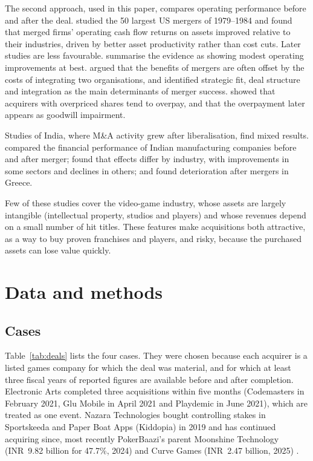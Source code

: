\documentclass[sn-basic]{sn-jnl}
\newcommand{\INR}{INR~}
\begin{document}
The second approach, used in this paper, compares operating performance before and after the deal. \citet{healy1992} studied the 50 largest US mergers of 1979--1984 and found that merged firms' operating cash flow returns on assets improved relative to their industries, driven by better asset productivity rather than cost cuts. Later studies are less favourable. \citet{andrade2001} summarise the evidence as showing modest operating improvements at best. \citet{lubatkin1983} argued that the benefits of mergers are often offset by the costs of integrating two organisations, and \citet{epstein2005} identified strategic fit, deal structure and integration as the main determinants of merger success. \citet{gu2011} showed that acquirers with overpriced shares tend to overpay, and that the overpayment later appears as goodwill impairment.

Studies of India, where M\&A activity grew after liberalisation, find mixed results. \citet{vanitha2007} compared the financial performance of Indian manufacturing companies before and after merger; \citet{mantravadi2008} found that effects differ by industry, with improvements in some sectors and declines in others; and \citet{pazarskis2006} found deterioration after mergers in Greece.

Few of these studies cover the video-game industry, whose assets are largely intangible (intellectual property, studios and players) and whose revenues depend on a small number of hit titles. These features make acquisitions both attractive, as a way to buy proven franchises and players, and risky, because the purchased assets can lose value quickly.

\section{Data and methods}\label{sec:methods}

\subsection{Cases}

Table~\ref{tab:deals} lists the four cases. They were chosen because each acquirer is a listed games company for which the deal was material, and for which at least three fiscal years of reported figures are available before and after completion. Electronic Arts completed three acquisitions within five months (Codemasters in February 2021, Glu Mobile in April 2021 and Playdemic in June 2021), which are treated as one event. Nazara Technologies bought controlling stakes in Sportskeeda and Paper Boat Apps (Kiddopia) in 2019 and has continued acquiring since, most recently PokerBaazi's parent Moonshine Technology (\INR 9.82 billion for 47.7\%, 2024) and Curve Games (\INR 2.47 billion, 2025) \citep{bs2024nazara,bs2025nazara}.
\end{document}
